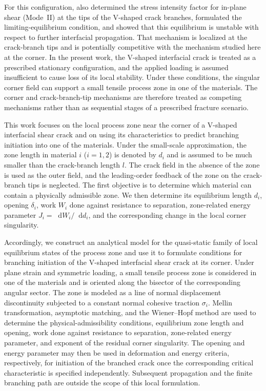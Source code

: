 \documentclass[pdflatex,iicol,sn-mathphys-ay]{sn-jnl}
\newcommand{\dd}{\mathop{}\!\mathrm{d}}
\begin{document}
For this configuration, \citet{NazarenkoKipnis2022Equilibrium} also determined
the stress intensity factor for in-plane shear (Mode~II) at the tips of the
V-shaped crack branches, formulated the limiting-equilibrium condition, and
showed that this equilibrium is unstable with respect to further interfacial
propagation. That mechanism is localized
at the crack-branch tips and is potentially competitive with the mechanism studied
here at the corner. In the present work, the V-shaped interfacial crack is
treated as a prescribed stationary configuration, and the applied loading is
assumed insufficient to cause loss of its local stability. Under these
conditions, the singular corner field can support a small tensile process
zone in one of the materials. The corner and crack-branch-tip mechanisms are
therefore treated as competing mechanisms rather than as sequential stages
of a prescribed fracture scenario.

This work focuses on the local process zone near the corner of a V-shaped
interfacial shear crack and on using its characteristics to predict
branching initiation into one of the materials. Under the small-scale
approximation, the zone length in material $i$ ($i=1,2$) is denoted by $d_i$
and is assumed to be much smaller than the crack-branch length $l$. The crack field in the absence of the zone is used as the outer field, and
the leading-order feedback of the zone on the crack-branch tips is neglected.
The first objective is to determine which material can contain a physically
admissible zone. We then determine its equilibrium length $d_i$, opening
$\delta_i$, work $W_i$ done against resistance to separation, zone-related
energy parameter $J_i=\dd W_i/\dd d_i$, and the corresponding change in the
local corner singularity.

Accordingly, we construct an analytical model for the quasi-static family of
local equilibrium states of the process zone and use it to formulate
conditions for branching initiation of the V-shaped interfacial shear crack
at its corner. Under plane strain and symmetric loading, a small tensile
process zone is considered in one of the materials and is oriented along the
bisector of the corresponding angular sector. The zone is modeled as a line
of normal displacement discontinuity subjected to a constant normal cohesive
traction $\sigma_i$. Mellin transformation, asymptotic matching, and the Wiener--Hopf method are
used to determine the physical-admissibility conditions, equilibrium zone
length and opening, work done against resistance to separation, zone-related
energy parameter, and exponent of the residual corner singularity. The opening
and energy parameter may then be used in deformation and energy criteria,
respectively, for initiation of the branched crack once the corresponding
critical characteristic is specified independently. Subsequent propagation and the finite branching path
are outside the scope of this local formulation.
\end{document}
